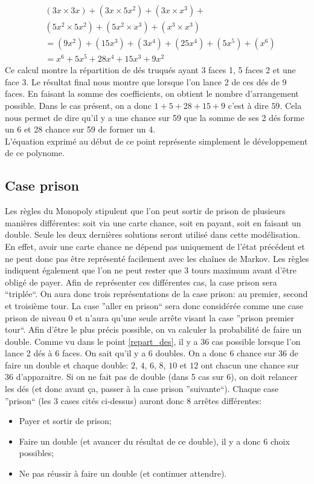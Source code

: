 \documentclass[letterpaper]{article}
\begin{document}
    \begin{align*}
     &(3x \times 3x) + (3x \times 5x^2) + (3x \times x^3) +\\
     &(5x^2 \times 5x^2) + (5x^2 \times x^3) + (x^3 \times x^3)\\
     &= (9x^2) + (15x^3) + (3x^4) + (25x^4) + (5x^5) + (x^6)\\
     &= x^6 + 5x^5 + 28x^4 + 15x^3 + 9x^2
    \end{align*}
    Ce calcul montre la répartition de dés truqués ayant 3 faces 1, 5 faces 2 et une face 3.
    Le résultat final nous montre que lorsque l'on lance 2 de ces dés de 9 faces. En faisant
    la somme des coefficients, on obtient le nombre d'arrangement possible.  Dans le cas
    présent, on a donc $1 + 5 + 28 + 15 + 9$ c'est à dire $59$.  Cela nous permet de dire
    qu'il y a une chance sur 59 que la somme de ses 2 dés forme un 6 et 28 chance sur 59
    de former un 4.\\
    L'équation exprimé au début de ce point représente simplement le développement de 
    ce polynome.
    
  \subsection{Case prison}
    Les règles du Monopoly stipulent que l'on peut sortir de prison de plusieurs manières 
    différentes: soit via une carte chance, soit en payant, soit en faisant un double.
    Seule les deux dernières solutions seront utilisé dans cette modélisation.  En effet,
    avoir une carte chance ne dépend pas uniquement de l'état précédent et ne peut donc
    pas être représenté facilement avec les chaînes de Markov. Les règles indiquent 
    également que l'on ne peut rester que 3 tours maximum avant d'être obligé de payer.
    Afin de représenter ces différentes cas, la case prison sera ``triplée``.  On aura
    donc trois représentations de la case prison: au premier, second et troisième tour.
    La case ''aller en prison`` sera donc considérée comme une case prison de niveau 0 et
    n'aura qu'une seule arrête visant la case ''prison premier tour``.
    Afin d'être le plus précis possible, on va calculer la probabilité de faire un double.
    Comme vu dans le point \ref{repart_des}, il y a 36 cas possible lorsque l'on lance 
    2 dés à 6 faces.  On sait qu'il y a 6 doubles.  On a donc 6 chance sur 36 de faire un
    double et chaque double: $2$, $4$, $6$, $8$, $10$ et $12$ ont chacun une chance sur 36
    d'apparaitre.  Si on ne fait pas de double (dans 5 cas sur 6), on doit relancer les 
    dés (et donc avant ça, passer à la case prison ''suivante``).
    Chaque case ''prison`` (les 3 cases cités ci-dessus) auront donc 8 arrêtes différentes:
    \begin{itemize}
     \item Payer et sortir de prison;
     \item Faire un double (et avancer du résultat de ce double), il y a donc 6 choix possibles;
     \item Ne pas réussir à faire un double (et continuer attendre).
    \end{itemize}
    
\end{document}
